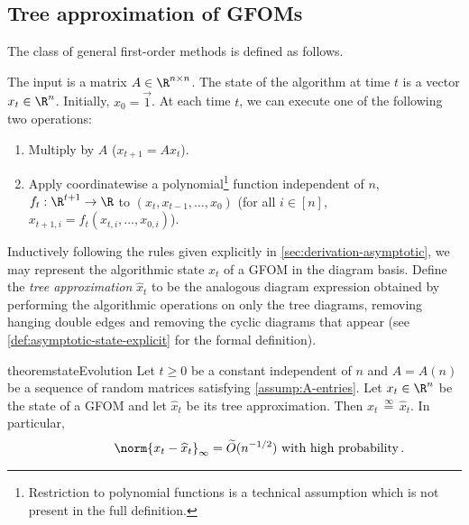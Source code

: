 \documentclass[12pt]{article}
\newcommand{\eqinf}{\,\overset{\infty}{=}\,}
\begin{document}
\subsection{Tree approximation of GFOMs}
\label{sec:gfom}


The class of general first-order methods is defined as follows.
\begin{definition}
\label{def:gfom}
The input is a matrix $A \in \R^{n \times n}$.
The state of the algorithm at time $t$
is a vector $x_t \in \R^n$. Initially, $x_0=\vec{1}$.
At each time $t$, we can execute one of the following two operations:
\begin{enumerate}
    \item Multiply by $A$ ($x_{t+1} = Ax_t$).
    \item Apply coordinatewise a polynomial\footnote{Restriction to polynomial functions is a technical assumption which is not present in the full definition.} function independent of $n$, $f_t : \R^{t+1} \to \R$ to $(x_t, x_{t-1}, \dots, x_0)$ (for all $i \in [n]$, $x_{t+1,i}=f_t(x_{t,i},\ldots,x_{0,i})$).
\end{enumerate}
\end{definition}

Inductively following the rules given explicitly in \cref{sec:derivation-asymptotic},
we may represent the algorithmic state $x_t$ of a GFOM in the diagram
basis.
Define the \emph{tree approximation} $\widehat{x}_t$ to be the analogous diagram expression obtained by performing the algorithmic operations on only the tree diagrams, removing hanging double edges and removing the cyclic diagrams that appear (see \cref{def:asymptotic-state-explicit} for the formal definition).

\begin{restatable}{theorem}{stateEvolution}
\label{thm:state-evolution}
    Let $t\ge 0$ be a constant independent of $n$ and $A=A(n)$ be a sequence of random matrices satisfying \cref{assump:A-entries}. 
    Let $x_t\in \R^n$ be the state of a GFOM and let $\widehat{x}_t$ be its tree approximation.
    Then $x_t \eqinf \widehat{x}_t$. In particular,
    \begin{align}
         \label{eq:concl-tree-1} \qquad \qquad \norm{x_t - \widehat{x}_t}_\infty = \widetilde{O}(n^{-1/2})\text{ with high probability}\,.
    \end{align}
\end{restatable}
\end{document}
